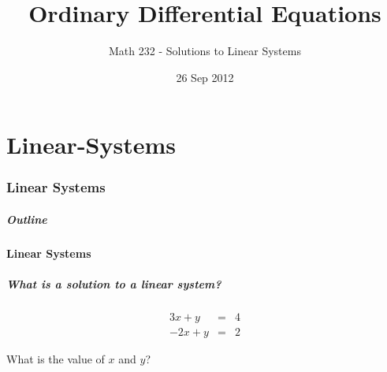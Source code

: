 \part{Linear-Systems}
\section{Linear Systems}

\title{Ordinary Differential Equations}
\subtitle{Math 232 - Solutions to Linear Systems}
\date{26 Sep 2012}

\begin{frame}
  \titlepage
\end{frame}

\begin{frame}
  \frametitle{Outline}
\end{frame}


\subsection{Linear Systems}


\begin{frame}
  \frametitle{What is a solution to a linear system?}

  \begin{eqnarray*}
    3x + y & = & 4 \\
    -2x + y & = & 2
  \end{eqnarray*}

  What is the value of $x$ and $y$?


\end{frame}


